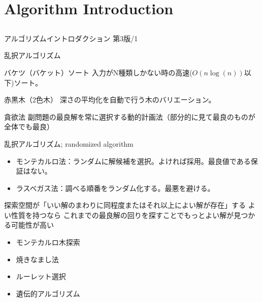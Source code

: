 \documentclass{beamer}
\begin{document}
\section{Algorithm Introduction}		%
\subsection{}

\begin{frame}[fragile]{アルゴリズムイントロダクション 第3版/1}{
\href{https://www.amazon.co.jp/アルゴリズムイントロダクション-第3版-総合版：世界標準MIT教科書-Thomas-Cormen-ebook/dp/B078WPYHGN/ref=sr_1_10}{}}

乱択アルゴリズム

\begin{block}{バケツ（バケット）ソート}
入力がN種類しかない時の高速($O(n\log(n))$以下)ソート。
\end{block}

\begin{block}{赤黒木（2色木）}
深さの平均化を自動で行う木のバリエーション。
\end{block}

\begin{block}{貪欲法}
副問題の最良解を常に選択する動的計画法（部分的に見て最良のものが全体でも最良）
\end{block}
\end{frame}

\begin{frame}[fragile]{乱択アルゴリズム; randomized algorithm}{}
\begin{itemize}%
\item モンテカルロ法：ランダムに解候補を選択。よければ採用。最良値である保証はない。
\item ラスベガス法：調べる順番をランダム化する。最悪を避ける。
\end{itemize}

\vfill
探索空間が「いい解のまわりに同程度またはそれ以上によい解が存在」する
よい性質を持つなら
これまでの最良解の回りを探すことでもっとよい解が見つかる可能性が高い

\vfill
\begin{itemize}%
\item モンテカルロ木探索
\item 焼きなまし法
\item ルーレット選択
\item 遺伝的アルゴリズム
\end{itemize}
\end{frame}
\end{document}
